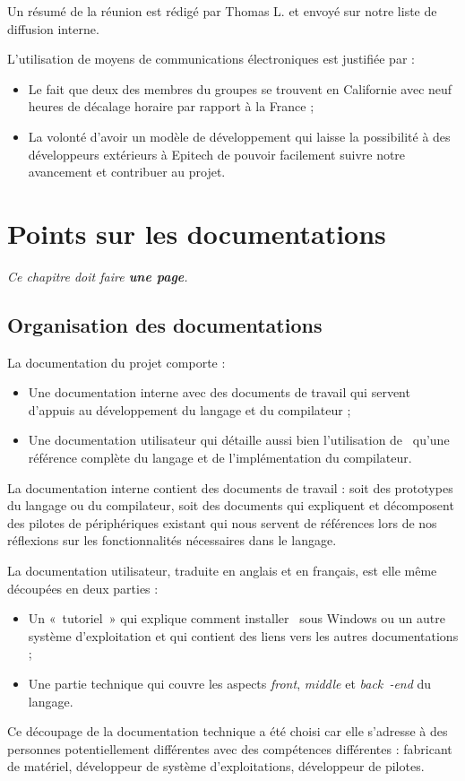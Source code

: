 \documentclass[francais]{rtxreport}
\begin{document}
Un résumé de la réunion est rédigé par Thomas L. et envoyé sur notre liste de
diffusion interne.

L'utilisation de moyens de communications électroniques est justifiée par :
\begin{itemize}
\item Le fait que deux des membres du groupes se trouvent en Californie avec
  neuf heures de décalage horaire par rapport à la France ;
\item La volonté d'avoir un modèle de développement qui laisse la possibilité à
  des développeurs extérieurs à Epitech de pouvoir facilement suivre notre
  avancement et contribuer au projet.
\end{itemize}

\chapter{Points sur les documentations}

\emph{Ce chapitre doit faire \textbf{une page}.}

\section{Organisation des documentations}

La documentation du projet comporte :
\begin{itemize}
\item Une documentation interne avec des documents de travail qui servent
  d'appuis au développement du langage et du compilateur ;
\item Une documentation utilisateur qui détaille aussi bien l'utilisation de
  \rtx\ qu'une référence complète du langage et de l'implémentation du
  compilateur.
\end{itemize}

La documentation interne contient des documents de travail : soit des prototypes
du langage ou du compilateur, soit des documents qui expliquent et décomposent
des pilotes de périphériques existant qui nous servent de références lors de nos
réflexions sur les fonctionnalités nécessaires dans le langage.

La documentation utilisateur, traduite en anglais et en français, est elle même
découpées en deux parties :
\begin{itemize}
\item Un «~tutoriel~» qui explique comment installer \rtx\ sous Windows ou un
  autre système d'exploitation et qui contient des liens vers les autres
  documentations ;
\item Une partie technique qui couvre les aspects \emph{front}, \emph{middle} et
  \emph{back~-end} du langage.
\end{itemize}
Ce découpage de la documentation technique a été choisi car elle s'adresse à des
personnes potentiellement différentes avec des compétences différentes :
fabricant de matériel, développeur de système d'exploitations, développeur de
pilotes.
\end{document}
